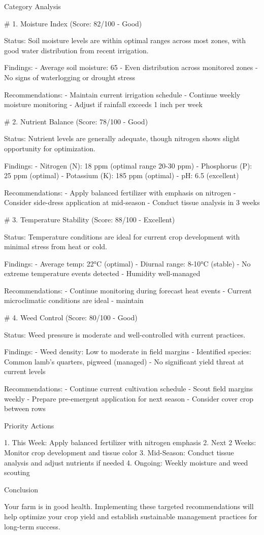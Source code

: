 \documentclass[12pt, a4paper]{article}
\begin{document}
 Category Analysis

# 1. Moisture Index (Score: 82/100 - Good)

Status: Soil moisture levels are within optimal ranges across most zones, with good water distribution from recent irrigation.

Findings:
- Average soil moisture: 65%
- Even distribution across monitored zones
- No signs of waterlogging or drought stress

Recommendations:
- Maintain current irrigation schedule
- Continue weekly moisture monitoring
- Adjust if rainfall exceeds 1 inch per week

# 2. Nutrient Balance (Score: 78/100 - Good)

Status: Nutrient levels are generally adequate, though nitrogen shows slight opportunity for optimization.

Findings:
- Nitrogen (N): 18 ppm (optimal range 20-30 ppm)
- Phosphorus (P): 25 ppm (optimal)
- Potassium (K): 185 ppm (optimal)
- pH: 6.5 (excellent)

Recommendations:
- Apply balanced fertilizer with emphasis on nitrogen
- Consider side-dress application at mid-season
- Conduct tissue analysis in 3 weeks

# 3. Temperature Stability (Score: 88/100 - Excellent)

Status: Temperature conditions are ideal for current crop development with minimal stress from heat or cold.

Findings:
- Average temp: 22°C (optimal)
- Diurnal range: 8-10°C (stable)
- No extreme temperature events detected
- Humidity well-managed

Recommendations:
- Continue monitoring during forecast heat events
- Current microclimatic conditions are ideal - maintain

# 4. Weed Control (Score: 80/100 - Good)

Status: Weed pressure is moderate and well-controlled with current practices.

Findings:
- Weed density: Low to moderate in field margins
- Identified species: Common lamb's quarters, pigweed (managed)
- No significant yield threat at current levels

Recommendations:
- Continue current cultivation schedule
- Scout field margins weekly
- Prepare pre-emergent application for next season
- Consider cover crop between rows

 Priority Actions

1. This Week: Apply balanced fertilizer with nitrogen emphasis
2. Next 2 Weeks: Monitor crop development and tissue color
3. Mid-Season: Conduct tissue analysis and adjust nutrients if needed
4. Ongoing: Weekly moisture and weed scouting

 Conclusion

Your farm is in good health. Implementing these targeted recommendations will help optimize your crop yield and establish sustainable management practices for long-term success.
\end{document}
